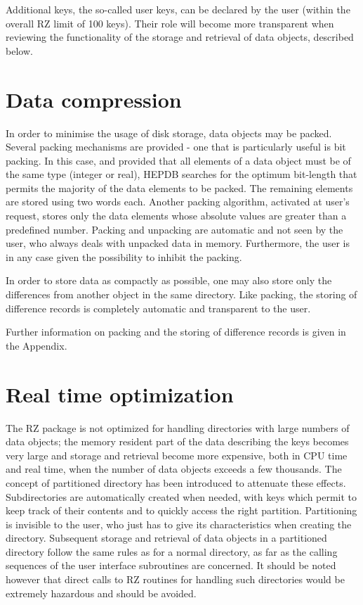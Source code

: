 Additional keys, the so-called user keys, can be declared by the user
(within the overall RZ \cite{bib-ZEBRARZ} limit of 100 keys).
Their role will become more
transparent when reviewing the functionality of the storage and
retrieval of data objects, described below.

\section{Data compression}

In order to minimise the usage of disk storage, data objects may be packed.
Several packing mechanisms are provided - one that is particularly useful
is bit packing. In this case, and provided that all elements of a data
object must be of the same type (integer or real), HEPDB
searches for the optimum bit-length that permits the majority of the data
elements to be packed. The remaining elements are stored using two words
each. Another
packing algorithm, activated at user's request, stores only the data
elements whose absolute values are greater than a predefined number.
Packing and unpacking are automatic and not seen by the user, who always
deals with unpacked data in memory. Furthermore, the user is in any case
given the possibility to inhibit the packing.

In order to store data as compactly as possible,
one may also store only the differences from another object
in the same directory.  Like packing,
the storing of difference records is completely automatic and transparent
to the user.

Further information on packing and the storing of difference records
is given in the Appendix.

\section{Real time optimization}

The RZ package is not optimized for handling directories with large numbers of
data objects; the memory resident part of the data describing the keys
becomes very large and storage and retrieval become more expensive, both
in CPU time and real time, when the number of data objects exceeds a few
thousands. The concept of partitioned directory has been introduced to
attenuate these effects. Subdirectories are automatically created when
needed, with keys which permit to keep track of their contents and to
quickly access the right partition. Partitioning is invisible to the
user, who just has to give its characteristics when creating the
directory. Subsequent storage and retrieval of data objects in a
partitioned directory follow the same rules as for a normal directory,
as far as the calling sequences of the user interface subroutines are
concerned. It should be noted however that direct calls to RZ routines
for handling such directories would be extremely hazardous and should
be avoided.

